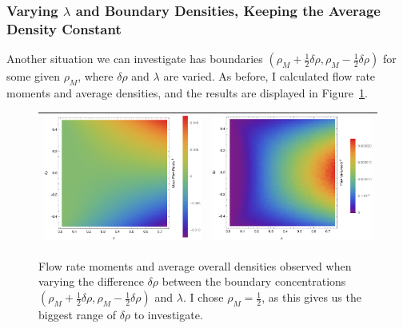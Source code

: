 \subsubsection{Varying $\lambda$ and Boundary Densities, Keeping the Average Density Constant}
Another situation we can investigate has boundaries $(\rho_M + \frac{1}{2} \delta\rho, \rho_M - \frac{1}{2} \delta\rho)$ for some given $\rho_M$, where $\delta\rho$ and $\lambda$ are varied. As before, I calculated flow rate moments and average
densities, and the results are displayed in Figure~\ref{fig:constDens}.

\begin{figure}[h!]
\vspace{1em}
\caption{\label{fig:constDens} Flow rate moments and average overall densities observed when varying the difference $\delta\rho$ between the boundary concentrations $(\rho_M + \frac{1}{2} \delta\rho, \rho_M - \frac{1}{2} \delta\rho)$ and $\lambda$.
I chose $\rho_M=\frac{1}{2}$, as this gives us the biggest range of $\delta\rho$ to investigate.}
\begin{center}
 \begin{tabular}{c|c}
    \includegraphics[width=0.5\linewidth]{../tex-src/images/constDens/meanFlow-crop} & \includegraphics[width=0.5\linewidth]{../tex-src/images/constDens/varFlow-crop} \\
    \hline

\end{tabular}
\end{center}
\end{figure}
